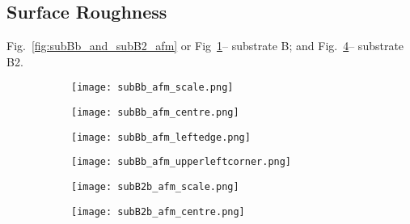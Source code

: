 \subsection{Surface Roughness}
Fig.~\ref{fig:subBb_and_subB2_afm} or Fig~\ref{fig:subBb_afm_centre}-- substrate B; and Fig.~\ref{fig:subB2b_afm_centre}-- substrate B2.

\begin{figure}[htbp]
    \centering
    \begin{subfigure}[t]{0.032\linewidth}
    \centering
        \texttt{[image: subBb\_afm\_scale.png]}
        \captionsetup{list=no}
    \end{subfigure}
    \hfill
    \begin{subfigure}[t]{0.3\linewidth}
    \centering
        \texttt{[image: subBb\_afm\_centre.png]}
        \caption{}\label{fig:subBb_afm_centre}%
    \end{subfigure}%
    \hfill
    \begin{subfigure}[t]{0.3\linewidth}
    \centering
        \texttt{[image: subBb\_afm\_leftedge.png]}
        \caption{}\label{fig:subBb_afm_edge}%
    \end{subfigure}%
    \hfill
    \begin{subfigure}[t]{0.3\linewidth}
    \centering
        \texttt{[image: subBb\_afm\_upperleftcorner.png]}
        \caption{}\label{fig:subBb_afm_corner} %
    \end{subfigure}%
    \par\bigskip
    \begin{subfigure}[t]{0.032\linewidth}
    \centering
        \texttt{[image: subB2b\_afm\_scale.png]}
        \captionsetup{list=no}
    \end{subfigure}
    \hfill
    \begin{subfigure}[t]{0.3\linewidth}
    \centering
        \texttt{[image: subB2b\_afm\_centre.png]}
        \caption{}\label{fig:subB2b_afm_centre}
    \end{subfigure}%
    \hfill
    \begin{subfigure}[t]{0.3\linewidth}

\end{subfigure}
\end{figure}
